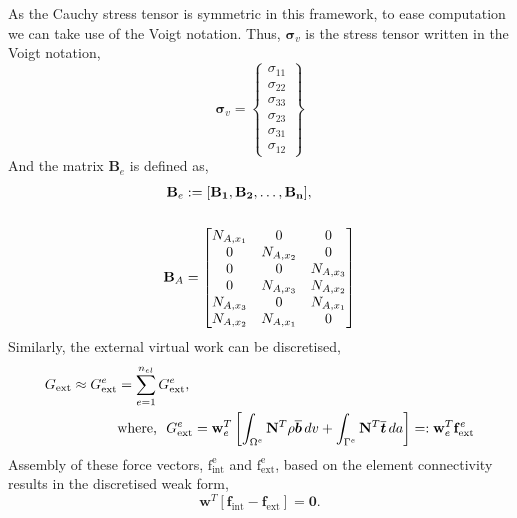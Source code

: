\documentclass[../main.tex]{subfiles}
\begin{document}
As the Cauchy stress tensor is symmetric in this framework, to ease computation we can take use of the Voigt notation. 
 Thus, $\boldsymbol{\sigma}_{v}$ is the stress tensor written in the Voigt notation,
\begin{equation}
    \boldsymbol{\sigma}_{v} = \begin{Bmatrix}
        \sigma_{11}\\
        \sigma_{22}\\
        \sigma_{33}\\
        \sigma_{23}\\
        \sigma_{31}\\
        \sigma_{12}
    \end{Bmatrix}
\end{equation}
And the matrix $\mathbf{B}_{e}$ is defined as,
\begin{align}
    \mathbf{B}_{e} &:= [\mathbf{B_{1}}, \mathbf{B_{2}}, \dots, \mathbf{B_{n}}], \notag\\
    \notag \\ 
    \mathbf{B}_{A} &= \begin{bmatrix}
        N_{A,x_{1}} & 0 & 0 \\
        0 & N_{A,x_{2}} & 0 \\
        0 & 0 & N_{A,x_{3}} \\
        0 & N_{A,x_{3}} & N_{A,x_{2}} \\
        N_{A,x_{3}} & 0 & N_{A,x_{1}} \\
        N_{A,x_{2}} & N_{A,x_{1}} & 0 \\
    \end{bmatrix}
\end{align}
%
Similarly, the external virtual work can be discretised,
\begin{align} \label{discretised_g_ext}
    G_{\text{ext}} \approx G^{e}_{\text{ext}} &= \sum^{n_{el}}_{e=1} G^{e}_{\text{ext}}, \notag \\
    &\text{where, }\,\, G^{e}_{\text{ext}} = \mathbf{w}^{T}_{e} \left[
    \int_{\Omega^{e}} \mathbf{N}^{T} \rho \overline{\boldsymbol{b}} \,dv + \int_{\Gamma^{e}} \mathbf{N}^{T} \overline{\boldsymbol{t}} \,da \right] =: \mathbf{w}^{T}_{e}\mathbf{f}^{e}_{\text{ext}}
\end{align}
%
Assembly of these force vectors, $\boldsymbol{\mathrm{f}}^{\mathrm{e}}_{\text{int}}$ and $\boldsymbol{\mathrm{f}}^{\mathrm{e}}_{\text{ext}}$, based on the element connectivity results in the discretised weak form,
 \begin{equation} \label{discretised_system_eq}
    \mathbf{w}^{T}[\mathbf{f}_{\text{int}} - \mathbf{f}_{\text{ext}}] = \boldsymbol{0}.
 \end{equation}
\end{document}
